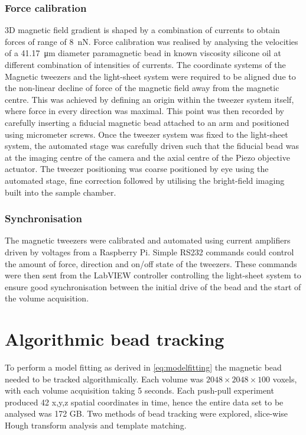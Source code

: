 \subsubsection{Force calibration}

3D magnetic field gradient is shaped by a combination of currents to obtain forces of range of \SI{8}{\nano\newton}.
Force calibration was realised by analysing the velocities of a \SI{41.17}{\micro\metre} diameter paramagnetic bead in known viscosity silicone oil at different combination of intensities of currents.
The coordinate systems of the Magnetic tweezers and the light-sheet system were required to be aligned due to the non-linear decline of force of the magnetic field away from the magnetic centre.
This was achieved by defining an origin within the tweezer system itself, where force in every direction was maximal.
This point was then recorded by carefully inserting a fiducial magnetic bead attached to an arm and positioned using micrometer screws.
Once the tweezer system was fixed to the light-sheet system, the automated stage was carefully driven such that the fiducial bead was at the imaging centre of the camera and the axial centre of the Piezo objective actuator.
The tweezer positioning was coarse positioned by eye using the automated stage, fine correction followed by utilising the bright-field imaging built into the sample chamber.

\subsubsection{Synchronisation}
The magnetic tweezers were calibrated and automated using current amplifiers driven by voltages from a Raspberry Pi.
Simple RS232 commands could control the amount of force, direction and on/off state of the tweezers.
These commands were then sent from the LabVIEW controller controlling the light-sheet system to ensure good synchronisation between the initial drive of the bead and the start of the volume acquisition.

\section{Algorithmic bead tracking}

To perform a model fitting as derived in \eqref{eq:modelfitting} the magnetic bead needed to be tracked algorithmically.
Each volume was $2048 \times 2048 \times 100$ voxels, with each volume acquisition taking 5 seconds.
Each push-pull experiment produced 42 x,y,z spatial coordinates in time, hence the entire data set to be analysed was 172 GB.
Two methods of bead tracking were explored, slice-wise Hough transform analysis and template matching.

